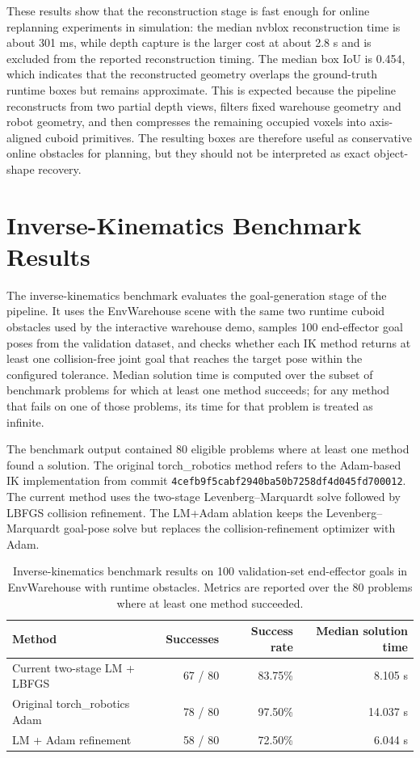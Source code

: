 \documentclass[11pt]{article}
\begin{document}
These results show that the reconstruction stage is fast enough for online replanning experiments in simulation: the median nvblox reconstruction time is about 301 ms, while depth capture is the larger cost at about 2.8 s and is excluded from the reported reconstruction timing. The median box IoU is 0.454, which indicates that the reconstructed geometry overlaps the ground-truth runtime boxes but remains approximate. This is expected because the pipeline reconstructs from two partial depth views, filters fixed warehouse geometry and robot geometry, and then compresses the remaining occupied voxels into axis-aligned cuboid primitives. The resulting boxes are therefore useful as conservative online obstacles for planning, but they should not be interpreted as exact object-shape recovery.

\section{Inverse-Kinematics Benchmark Results}

The inverse-kinematics benchmark evaluates the goal-generation stage of the pipeline. It uses the EnvWarehouse scene with the same two runtime cuboid obstacles used by the interactive warehouse demo, samples 100 end-effector goal poses from the validation dataset, and checks whether each IK method returns at least one collision-free joint goal that reaches the target pose within the configured tolerance. Median solution time is computed over the subset of benchmark problems for which at least one method succeeds; for any method that fails on one of those problems, its time for that problem is treated as infinite.

The benchmark output contained 80 eligible problems where at least one method found a solution. The original torch\_robotics method refers to the Adam-based IK implementation from commit \texttt{4cefb9f5cabf2940ba50b7258df4d045fd700012}. The current method uses the two-stage Levenberg--Marquardt solve followed by LBFGS collision refinement. The LM+Adam ablation keeps the Levenberg--Marquardt goal-pose solve but replaces the collision-refinement optimizer with Adam.

\begin{table}[htbp]
    \centering
    \begin{tabular}{l r r r}
        \hline
        Method & Successes & Success rate & Median solution time \\
        \hline
        Current two-stage LM + LBFGS & 67 / 80 & 83.75\% & 8.105 s \\
        Original torch\_robotics Adam & 78 / 80 & 97.50\% & 14.037 s \\
        LM + Adam refinement & 58 / 80 & 72.50\% & 6.044 s \\
        \hline
    \end{tabular}
    \caption{Inverse-kinematics benchmark results on 100 validation-set end-effector goals in EnvWarehouse with runtime obstacles. Metrics are reported over the 80 problems where at least one method succeeded.}
    \label{tab:ik-benchmark}
\end{table}
\end{document}
